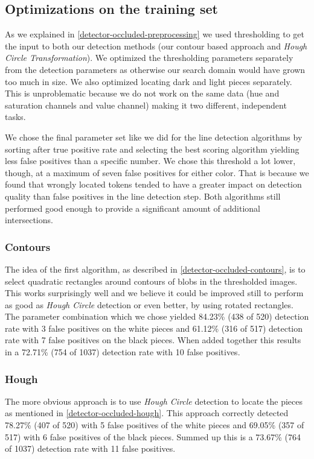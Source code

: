 	\subsection{Optimizations on the training set}
	\label{evaluation-occluded-optimization}
	As we explained in \autoref{detector-occluded-preprocessing} we used thresholding to get the input to both our detection methods (our contour based approach and \emph{Hough Circle Transformation}). We optimized the thresholding parameters separately from the detection parameters as otherwise our search domain would have grown too much in size. We also optimized locating dark and light pieces separately. This is unproblematic because we do not work on the same data (hue and saturation channels and value channel) making it two different, independent tasks.

	We chose the final parameter set like we did for the line detection algorithms by sorting after true positive rate and selecting the best scoring algorithm yielding less false positives than a specific number. We chose this threshold a lot lower, though, at a maximum of seven false positives for either color. That is because we found that wrongly located tokens tended to have a greater impact on detection quality than false positives in the line detection step. Both algorithms still performed good enough to provide a significant amount of additional intersections.

	\subsubsection{Contours}
	\label{evaluation-occluded-optimization-contours}
	The idea of the first algorithm, as described in \autoref{detector-occluded-contours}, is to select quadratic rectangles around contours of blobs in the thresholded images. This works surprisingly well and we believe it could be improved still to perform as good as \emph{Hough Circle} detection or even better, by using rotated rectangles. The parameter combination which we chose yielded 84.23\% (438 of 520) detection rate with 3 false positives on the white pieces and 61.12\% (316 of 517) detection rate with 7 false positives on the black pieces. When added together this results in a 72.71\% (754 of 1037) detection rate with 10 false positives.

	\subsubsection{Hough}
	\label{evaluation-occluded-optimization-hough}
	The more obvious approach is to use \emph{Hough Circle} detection to locate the pieces as mentioned in \autoref{detector-occluded-hough}. This approach correctly detected 78.27\% (407 of 520) with 5 false positives of the white pieces and 69.05\% (357 of 517) with 6 false positives of the black pieces. Summed up this is a 73.67\% (764 of 1037) detection rate with 11 false positives.

